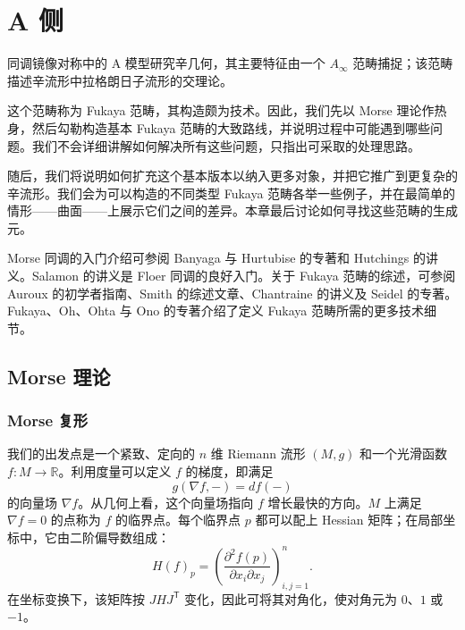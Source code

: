 \chapter{A 侧}\label{ch:a-side}
同调镜像对称中的 A 模型研究辛几何，其主要特征由一个 $A_\infty$ 范畴捕捉；该范畴描述辛流形中拉格朗日子流形的交理论。

这个范畴称为 Fukaya 范畴，其构造颇为技术。因此，我们先以 Morse 理论作热身，然后勾勒构造基本 Fukaya 范畴的大致路线，并说明过程中可能遇到哪些问题。我们不会详细讲解如何解决所有这些问题，只指出可采取的处理思路。

随后，我们将说明如何扩充这个基本版本以纳入更多对象，并把它推广到更复杂的辛流形。我们会为可以构造的不同类型 Fukaya 范畴各举一些例子，并在最简单的情形——曲面——上展示它们之间的差异。本章最后讨论如何寻找这些范畴的生成元。

Morse 同调的入门介绍可参阅 Banyaga 与 Hurtubise 的专著和 Hutchings 的讲义。Salamon 的讲义是 Floer 同调的良好入门。关于 Fukaya 范畴的综述，可参阅 Auroux 的初学者指南、Smith 的综述文章、Chantraine 的讲义及 Seidel 的专著。Fukaya、Oh、Ohta 与 Ono 的专著介绍了定义 Fukaya 范畴所需的更多技术细节。

\section{Morse 理论}\label{sec:morse-theory}
\subsection{Morse 复形}\label{subsec:morse-complex}
我们的出发点是一个紧致、定向的 $n$ 维 Riemann 流形 $(M,g)$ 和一个光滑函数 $f\colon M\to\mathbb R$。利用度量可以定义 $f$ 的梯度，即满足
\[
  g(\nabla f,-)=df(-)
\]
的向量场 $\nabla f$。从几何上看，这个向量场指向 $f$ 增长最快的方向。$M$ 上满足 $\nabla f=0$ 的点称为 $f$ 的临界点。每个临界点 $p$ 都可以配上 Hessian 矩阵；在局部坐标中，它由二阶偏导数组成：
\[
  H(f)_p=\left(\frac{\partial^2f(p)}{\partial x_i\partial x_j}\right)_{i,j=1}^n.
\]
在坐标变换下，该矩阵按 $JHJ^{\mathsf T}$ 变化，因此可将其对角化，使对角元为 $0$、$1$ 或 $-1$。

